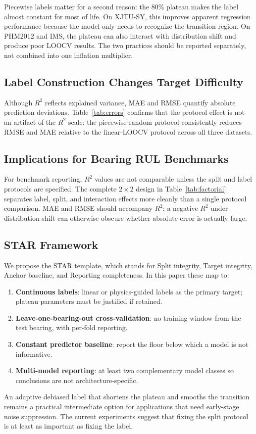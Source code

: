 \documentclass[5p,twocolumn]{elsarticle}
\begin{document}
Piecewise labels matter for a second reason: the 80\% plateau makes the label almost constant for most of life. On XJTU-SY, this improves apparent regression performance because the model only needs to recognize the transition region. On PHM2012 and IMS, the plateau can also interact with distribution shift and produce poor LOOCV results. The two practices should be reported separately, not combined into one inflation multiplier.
\subsection{Label Construction Changes Target Difficulty}

Although $R^2$ reflects explained variance, MAE and RMSE quantify absolute prediction deviations. Table~\ref{tab:errors} confirms that the protocol effect is not an artifact of the $R^2$ scale: the piecewise-random protocol consistently reduces RMSE and MAE relative to the linear-LOOCV protocol across all three datasets.

\subsection{Implications for Bearing RUL Benchmarks}
For benchmark reporting, $R^2$ values are not comparable unless the split and label protocols are specified. The complete $2 \times 2$ design in Table~\ref{tab:factorial} separates label, split, and interaction effects more cleanly than a single protocol comparison. MAE and RMSE should accompany $R^2$; a negative $R^2$ under distribution shift can otherwise obscure whether absolute error is actually large.

\subsection{STAR Framework}
We propose the STAR template, which stands for Split integrity, Target integrity, Anchor baseline, and Reporting completeness. In this paper these map to:
\begin{enumerate}
    \item \textbf{Continuous labels}: linear or physics-guided labels as the primary target; plateau parameters must be justified if retained.
    \item \textbf{Leave-one-bearing-out cross-validation}: no training window from the test bearing, with per-fold reporting.
    \item \textbf{Constant predictor baseline}: report the floor below which a model is not informative.
    \item \textbf{Multi-model reporting}: at least two complementary model classes so conclusions are not architecture-specific.
\end{enumerate}
An adaptive debiased label that shortens the plateau and smooths the transition remains a practical intermediate option for applications that need early-stage noise suppression. The current experiments suggest that fixing the split protocol is at least as important as fixing the label.
\end{document}
